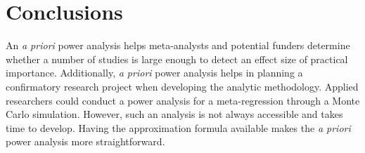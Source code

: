 \section{Conclusions}

An \textit{a priori} power analysis helps meta-analysts and potential funders determine whether a number of studies is large enough to detect an effect size of practical importance. Additionally, \textit{a priori} power analysis helps in planning a confirmatory research project when developing the analytic methodology. Applied researchers could conduct a power analysis for a meta-regression through a Monte Carlo simulation. However, such an analysis is not always accessible and takes time to develop. Having the approximation formula available makes the \textit{a priori} power analysis more straightforward.







